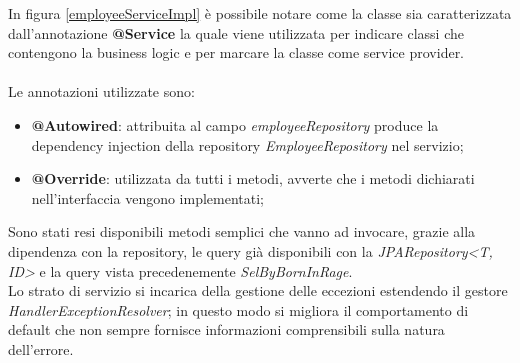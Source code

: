 In figura \ref{employeeServiceImpl} è possibile notare come la classe sia caratterizzata dall'annotazione \textbf{@Service} la quale viene utilizzata per indicare classi che contengono la business logic e per marcare la classe come service provider.\\\\
Le annotazioni utilizzate sono:
\begin{itemize}
  \item \textbf{@Autowired}: attribuita al campo \textit{employeeRepository} produce la dependency injection della repository \textit{EmployeeRepository} nel servizio;
  \item \textbf{@Override}: utilizzata da tutti i metodi, avverte che i metodi dichiarati nell'interfaccia vengono implementati;
\end{itemize}
Sono stati resi disponibili metodi semplici che vanno ad invocare, grazie alla dipendenza con la repository, le query già disponibili con la \textit{JPARepository<T, ID>} e la query vista precedenemente \textit{SelByBornInRage}.\\
Lo strato di servizio si incarica della gestione delle eccezioni estendendo il gestore  \textit{HandlerExceptionResolver}; in questo modo si migliora il comportamento di default che non sempre fornisce informazioni comprensibili sulla natura dell'errore.
